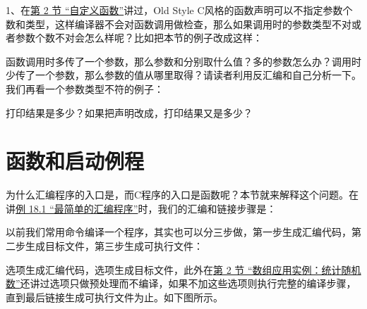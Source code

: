 1、在\hyperlink{db.ch03s02.id2712975}{第 2 节 “自定义函数”}讲过，Old Style C风格的函数声明可以不指定参数个数和类型，这样编译器不会对函数调用做检查，那么如果调用时的参数类型不对或者参数个数不对会怎么样呢？比如把本节的例子改成这样：




函数调用时多传了一个参数，那么参数和分别取什么值？多的参数怎么办？调用时少传了一个参数，那么参数的值从哪里取得？请读者利用反汇编和自己分析一下。我们再看一个参数类型不符的例子：




打印结果是多少？如果把声明改成，打印结果又是多少？




\section{函数和启动例程}
%
为什么汇编程序的入口是，而C程序的入口是函数呢？本节就来解释这个问题。在讲\hyperlink{db.ch18s01.id2769136}{例 18.\BookSplit{}1 “最简单的汇编程序”}时，我们的汇编和链接步骤是：




以前我们常用命令编译一个程序，其实也可以分三步做，第一步生成汇编代码，第二步生成目标文件，第三步生成可执行文件：




选项生成汇编代码，选项生成目标文件，此外在\hyperlink{db.ch08s02.id2733695}{第 2 节 “数组应用实例：统计随机数”}还讲过选项只做预处理而不编译，如果不加这些选项则执行完整的编译步骤，直到最后链接生成可执行文件为止。如下图所示。


